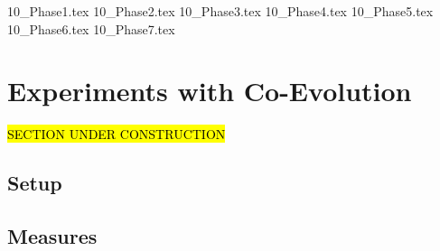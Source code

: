 {10_Phase1.tex}
{10_Phase2.tex}
{10_Phase3.tex}
{10_Phase4.tex}
{10_Phase5.tex}
{10_Phase6.tex}
{10_Phase7.tex}

\section{Experiments with Co-Evolution}
\hl{SECTION UNDER CONSTRUCTION}\\
\subsection{Setup}
\subsection{Measures}

